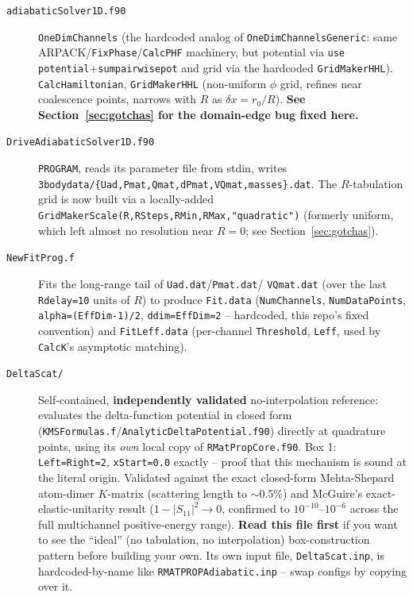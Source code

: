 \documentclass[11pt]{article}
\newcommand{\file}[1]{\texttt{#1}}
\newcommand{\sub}[1]{\texttt{#1}}
\begin{document}
\begin{description}
\item[\file{adiabaticSolver1D.f90}] \sub{OneDimChannels} (the hardcoded analog of
  \sub{OneDimChannelsGeneric}: same ARPACK/\sub{FixPhase}/\sub{CalcPHF} machinery, but potential
  via \texttt{use potential}+\sub{sumpairwisepot} and grid via the hardcoded \sub{GridMakerHHL}).
  \sub{CalcHamiltonian}, \sub{GridMakerHHL} (non-uniform $\phi$ grid, refines near coalescence
  points, narrows with $R$ as $\delta x=r_0/R$). \textbf{See Section~\ref{sec:gotchas} for the
  domain-edge bug fixed here.}
\item[\file{DriveAdiabaticSolver1D.f90}] \texttt{PROGRAM}, reads its parameter file from stdin,
  writes \texttt{3bodydata/\{Uad,Pmat,Qmat,dPmat,VQmat,masses\}.dat}. The $R$-tabulation grid is
  now built via a locally-added \sub{GridMakerScale(R,RSteps,RMin,RMax,"quadratic")} (formerly
  uniform, which left almost no resolution near $R=0$; see
  Section~\ref{sec:gotchas}).
\item[\file{NewFitProg.f}] Fits the long-range tail of \texttt{Uad.dat}/\texttt{Pmat.dat}/
  \texttt{VQmat.dat} (over the last \texttt{Rdelay=10} units of $R$) to produce
  \texttt{Fit.data} (\texttt{NumChannels}, \texttt{NumDataPoints}, \texttt{alpha=(EffDim-1)/2},
  \texttt{ddim=EffDim=2} -- hardcoded, this repo's fixed convention) and
  \texttt{FitLeff.data} (per-channel \texttt{Threshold}, \texttt{Leff}, used by \sub{CalcK}'s
  asymptotic matching).
\item[\file{DeltaScat/}] Self-contained, \textbf{independently validated} no-interpolation
  reference: evaluates the delta-function potential in closed form
  (\file{KMSFormulas.f}/\file{AnalyticDeltaPotential.f90}) directly at quadrature points, using
  its \emph{own} local copy of \file{RMatPropCore.f90}. Box 1: \texttt{Left=Right=2},
  \texttt{xStart=0.0} exactly -- proof that this mechanism is sound at the literal origin.
  Validated against the exact closed-form Mehta-Shepard atom-dimer $K$-matrix (scattering length
  to $\sim$0.5\%) and McGuire's exact-elastic-unitarity result ($1-|S_{11}|^2\to0$, confirmed to
  $10^{-10}$--$10^{-6}$ across the full multichannel positive-energy range). \textbf{Read this
  file first} if you want to see the ``ideal'' (no tabulation, no interpolation) box-construction
  pattern before building your own. Its own input file, \texttt{DeltaScat.inp}, is
  hardcoded-by-name like \texttt{RMATPROPAdiabatic.inp} -- swap configs by copying over it.
\end{description}
\end{document}
